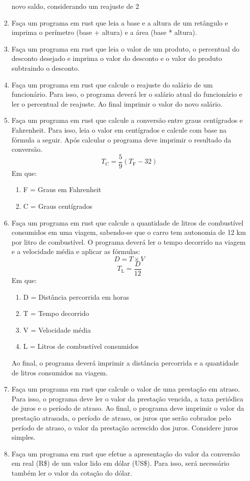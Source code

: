 \documentclass[12pt,a4paper,oneside]{abntex2}
\begin{document}
\begin{enumerate}
novo saldo, considerando um reajuste de 2%
\item Faça um programa em rust que leia a base e a altura de um retângulo e imprima o
perímetro (base + altura) e a área (base * altura).
\item Faça um programa em rust que leia o valor de um produto, o percentual do desconto desejado e imprima o valor do desconto e o valor do produto subtraindo o
desconto.
\item Faça um programa em rust que calcule o reajuste do salário de um funcionário. Para
isso, o programa deverá ler o salário atual do funcionário e ler o percentual de
reajuste. Ao final imprimir o valor do novo salário.
\item Faça um programa em rust que calcule a conversão entre graus centígrados e Fahrenheit. Para isso, leia o valor em centígrados e calcule com base na fórmula a
seguir. Após calcular o programa deve imprimir o resultado da conversão.
\begin{equation}
T_{\text{C}} = \frac{5}{9}(T_{\text{F}} - 32)
\end{equation}
Em que:
\begin{enumerate}
    \item F = Graus em Fahrenheit
    \item C = Graus centígrados
\end{enumerate}

\item Faça um programa em rust que calcule a quantidade de litros de combustível consumidos em uma viagem, sabendo-se que o carro tem autonomia de 12 km por
litro de combustível. O programa deverá ler o tempo decorrido na viagem e a
velocidade média e aplicar as fórmulas:
\begin{equation}
D = T \times V
\end{equation}
\begin{equation}
T_{\text{L}} = \frac{D}{12}
\end{equation}
Em que:
\begin{enumerate}
    \item D = Distância percorrida em horas
    \item T = Tempo decorrido
\item V = Velocidade média
\item L = Litros de combustível consumidos
\end{enumerate}

Ao final, o programa deverá imprimir a distância percorrida e a quantidade de
litros consumidos na viagem.
\item Faça um programa em rust que calcule o valor de uma prestação em atraso. Para
isso, o programa deve ler o valor da prestação vencida, a taxa periódica de juros
e o período de atraso. Ao final, o programa deve imprimir o valor da prestação
atrasada, o período de atraso, os juros que serão cobrados pelo período de atraso,
o valor da prestação acrescido dos juros. Considere juros simples.
\item Faça um programa em rust que efetue a apresentação do valor da conversão em
real (R\$) de um valor lido em dólar (US\$). Para isso, será necessário também ler o
valor da cotação do dólar.

\end{enumerate}
\end{document}
